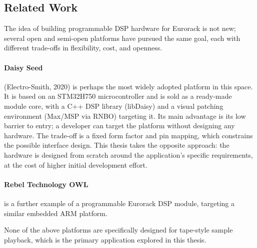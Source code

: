 
\subsection{Related Work}
\label{sec:related-work}

The idea of building programmable DSP hardware for Eurorack is not new; several open and semi-open platforms have pursued the same goal, each with different trade-offs in flexibility, cost, and openness.

\paragraph{Daisy Seed \cite{electrosmithDaisyHardware}} (Electro-Smith, 2020) is perhaps the most widely adopted platform in this space.
It is based on an STM32H750 microcontroller and is sold as a ready-made module core,
with a C++ DSP library (libDaisy) and a visual patching environment (Max/MSP via RNBO) targeting it.
Its main advantage is its low barrier to entry; a developer can target the platform without
designing any hardware.
The trade-off is a fixed form factor and pin mapping, which constrains the possible interface design.
This thesis takes the opposite approach: the hardware is designed from scratch around the
application's specific requirements, at the cost of higher initial development effort.

\paragraph{Rebel Technology OWL \cite{Genius2022}} is a further example of a programmable Eurorack DSP module,
targeting a similar embedded ARM platform.

None of the above platforms are specifically designed for tape-style sample playback, which is the primary application explored in this thesis.

